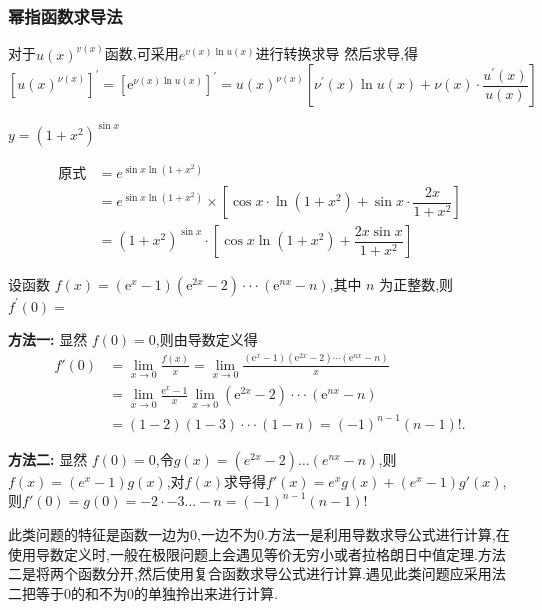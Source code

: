 \documentclass[8pt a4paper, oneside, UTF8]{ctexbook}  %
\begin{document}
\begin{sloppypar}
    \subsubsection{幂指函数求导法}
    对于$u(x)^{v(x)}$函数,可采用$e^{v(x)\ln u(x)}$进行转换求导
    然后求导,得
    $$
        \left[u(x)^{\nu(x)}\right]^{\prime}=\left[\mathrm{e}^{\nu(x)\ln u(x)}\right]^{\prime}=u(x)^{\nu(x)}\left[\nu^{\prime}(x)\ln u(x)+\nu(x)\cdot\frac{u^{\prime}(x)}{u(x)}\right]
    $$
    \begin{problem}
    $y=(1+x^2)^{\sin x}$
    \end{problem}
    \begin{solution}
        \begin{align*}
            \text{原式} & = e^{\sin x\ln(1+x^2)}                                                                 \\
                      & = e^{\sin x\ln(1+x^2)} \times [ \cos x \cdot \ln(1+x^2)+\sin x\cdot \dfrac{2x}{1+x^2}] \\
                      & = (1+x^{2})^{\sin x}\cdot[\cos x\ln(1+x^{2})+\dfrac{2 x \sin x}{1+x^{2}}]
        \end{align*}
    \end{solution}
    \begin{problem}
    设函数 $f(x)=(\mathrm{e}^x-1)(\mathrm{e}^{2x}-2)\cdotp\cdotp\cdotp(\mathrm{e}^{nx}-n)$,其中 $n$ 为正整数,则 $f^{\prime}(0)=$
    \end{problem}
    \begin{solution}{\textbf{方法一:}}
        显然 $f(0)=0$,则由导数定义得
        \begin{align*}
            f'(0) & =\lim_{x\to0}\frac{f(x)}{x}=\lim_{x\to0}\frac{(\mathrm{e}^x-1)(\mathrm{e}^{2x}-2)\cdots(\mathrm{e}^{nx}-n)}{x} \\&=\lim_{x\to0}\frac{\mathrm{e}^x-1}{x}\lim_{x\to0}(\mathrm{e}^{2x}-2)\cdotp\cdotp\cdotp(\mathrm{e}^{nx}-n)\\&=(1-2)(1-3)\cdotp\cdotp\cdotp(1-n)=(-1)^{n-1}(n-1)!.
        \end{align*}
    \end{solution}
    \begin{solution}{\textbf{方法二:}}
        显然 $f(0)=0$,令$g(x)=(e^{2x}-2)\dots(e^{nx}-n)$,则$f(x)=(e^x-1)g(x)$,对$f(x)$求导得$f'(x)=e^xg(x)+(e^x-1)g'(x)$,则$f'(0)=g(0)=-2\cdot-3 \dots -n=(-1)^{n-1}(n-1)!$
    \end{solution}
    \begin{note}
        此类问题的特征是函数一边为0,一边不为0.方法一是利用导数求导公式进行计算,在使用导数定义时,一般在极限问题上会遇见等价无穷小或者拉格朗日中值定理.方法二是将两个函数分开,然后使用复合函数求导公式进行计算.遇见此类问题应采用法二把等于0的和不为0的单独拎出来进行计算.

\end{note}
\end{sloppypar}
\end{document}

